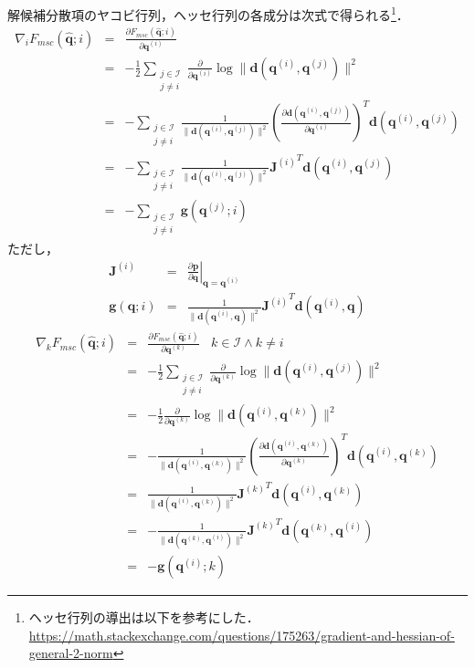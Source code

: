 解候補分散項のヤコビ行列，ヘッセ行列の各成分は次式で得られる\footnote{ヘッセ行列の導出は以下を参考にした．\url{https://math.stackexchange.com/questions/175263/gradient-and-hessian-of-general-2-norm}}．
\begin{subequations}
\begin{eqnarray}
  \nabla_i F_{\mathit{msc}}(\bm{\hat{q}}; i) &=& \frac{\partial F_{\mathit{msc}}(\bm{\hat{q}}; i)}{\partial \bm{q}^{(i)}} \\
  &=& - \frac{1}{2} \sum_{\substack{j \in \mathcal{I} \\ j \not= i}} \frac{\partial}{\partial \bm{q}^{(i)}} \log \| \bm{d}(\bm{q}^{(i)}, \bm{q}^{(j)}) \|^2 \\
  &=& - \sum_{\substack{j \in \mathcal{I} \\ j \not= i}} \frac{1}{\| \bm{d}(\bm{q}^{(i)}, \bm{q}^{(j)}) \|^2} \left( \frac{\partial \bm{d}(\bm{q}^{(i)}, \bm{q}^{(j)})}{\partial \bm{q}^{(i)}} \right)^T \bm{d}(\bm{q}^{(i)}, \bm{q}^{(j)})\\
  &=& - \sum_{\substack{j \in \mathcal{I} \\ j \not= i}} \frac{1}{\| \bm{d}(\bm{q}^{(i)}, \bm{q}^{(j)}) \|^2} {\bm{J}^{(i)}}^T \bm{d}(\bm{q}^{(i)}, \bm{q}^{(j)})\\
  &=& - \sum_{\substack{j \in \mathcal{I} \\ j \not= i}} \bm{g}(\bm{q}^{(j)}; i)
\end{eqnarray}
\end{subequations}
ただし，
\begin{eqnarray}
  \bm{J}^{(i)} &=& \left. \frac{\partial \bm{p}}{\partial \bm{q}} \right|_{\bm{q}=\bm{q}^{(i)}} \\
  \bm{g}(\bm{q}; i) &=& \frac{1}{\| \bm{d}(\bm{q}^{(i)}, \bm{q}) \|^2} {\bm{J}^{(i)}}^T \bm{d}(\bm{q}^{(i)}, \bm{q})
\end{eqnarray}
\begin{subequations}
\begin{eqnarray}
  \nabla_k F_{\mathit{msc}}(\bm{\hat{q}}; i) &=& \frac{\partial F_{\mathit{msc}}(\bm{\hat{q}}; i)}{\partial \bm{q}^{(k)}} \ \ \ \ k \in \mathcal{I} \land k \not= i \\
  &=& - \frac{1}{2} \sum_{\substack{j \in \mathcal{I} \\ j \not= i}} \frac{\partial}{\partial \bm{q}^{(k)}} \log \| \bm{d}(\bm{q}^{(i)}, \bm{q}^{(j)}) \|^2 \\
  &=& - \frac{1}{2} \frac{\partial}{\partial \bm{q}^{(k)}} \log \| \bm{d}(\bm{q}^{(i)}, \bm{q}^{(k)}) \|^2 \\
  &=& - \frac{1}{\| \bm{d}(\bm{q}^{(i)}, \bm{q}^{(k)}) \|^2} \left( \frac{\partial \bm{d}(\bm{q}^{(i)}, \bm{q}^{(k)})}{\partial \bm{q}^{(k)}} \right)^T \bm{d}(\bm{q}^{(i)}, \bm{q}^{(k)})\\
  &=& \frac{1}{\| \bm{d}(\bm{q}^{(i)}, \bm{q}^{(k)}) \|^2} {\bm{J}^{(k)}}^T \bm{d}(\bm{q}^{(i)}, \bm{q}^{(k)}) \\
  &=& - \frac{1}{\| \bm{d}(\bm{q}^{(k)}, \bm{q}^{(i)}) \|^2} {\bm{J}^{(k)}}^T \bm{d}(\bm{q}^{(k)}, \bm{q}^{(i)}) \\
  &=& - \bm{g}(\bm{q}^{(i)}; k)
\end{eqnarray}
\end{subequations}
